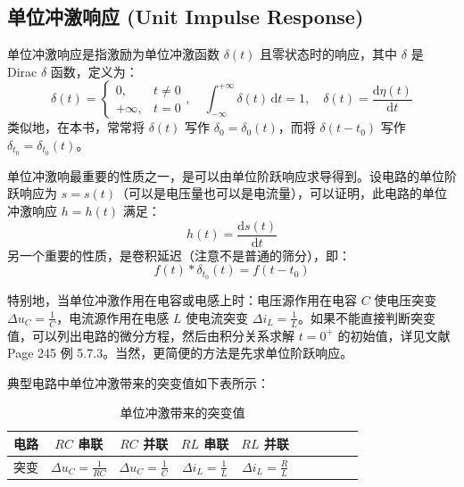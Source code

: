 \documentclass[UTF8]{report}
\theoremstyle{MyLineTheoremStyle} %
\theoremstyle{MyBlockTheoremStyle} %
\theoremstyle{MySubsubsectionStyle} %
\begin{document}
\subsection{单位冲激响应 (Unit Impulse Response)}
单位冲激响应是指激励为单位冲激函数 $\delta(t)$ 且零状态时的响应，其中 $\delta$ 是 Dirac $\delta$ 函数，定义为：
\begin{equation}
\delta(t) =
\begin{cases}
    0, & t \neq 0 \\
    +\infty, & t = 0
\end{cases},\quad \int_{-\infty}^{+\infty} \delta(t) \,\mathrm{d}t = 1,\quad \delta(t) = \frac{\mathrm{d} \eta(t)}{\mathrm{d} t}
\end{equation}
类似地，在本书，常常将 $\delta(t)$ 写作 $\delta_0 = \delta_0(t)$，而将 $\delta(t - t_0) $ 写作 $\delta_{t_0} = \delta_{t_0}(t)$。


单位冲激响最重要的性质之一，是可以由单位阶跃响应求导得到。设电路的单位阶跃响应为 $s = s(t)$（可以是电压量也可以是电流量），可以证明，此电路的单位冲激响应 $h = h(t)$ 满足：
\begin{equation}\label{for:单位冲激响应}
h(t) = \frac{\mathrm{d} s(t)}{\mathrm{d} t}
\end{equation}
另一个重要的性质，是卷积延迟（注意不是普通的筛分），即：
\begin{equation}
f(t)*\delta_{t_0}(t) = f(t - t_0)
\end{equation}


特别地，当单位冲激作用在电容或电感上时：电压源作用在电容 $C$ 使电压突变 $\Delta u_C = \frac{1}{C}$，电流源作用在电感 $L$ 使电流突变 $\Delta i_L = \frac{1}{L}$。如果不能直接判断突变值，可以列出电路的微分方程，然后由积分关系求解 $t = 0^+$ 的初始值，详见文献 \cite{电路原理习题集} Page 245 例 5.7.3。当然，更简便的方法是先求单位阶跃响应。

典型电路中单位冲激带来的突变值如下表所示：
\begin{table}[H]\centering
    \caption{单位冲激带来的突变值}
    \label{单位冲激带来的突变值}
\begin{tabular}{cccccccccc}\toprule
    电路 & $R C$ 串联 & $RC$ 并联 & $RL$ 串联 & $RL$ 并联  \\
    \midrule
    突变 & $\Delta u_C = \frac{1}{RC}$ & $\Delta u_C = \frac{1}{C}$ & $\Delta i_L = \frac{1}{L}$ & $\Delta i_L = \frac{R}{L}$  \\
    \bottomrule
\end{tabular}
\end{table}
\end{document}

